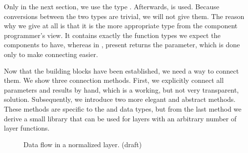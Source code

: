 \documentclass[preprint,natbib]{sigplanconf}
\begin{document}

\bc
Only in the next section, we use the type . Afterwards,  is used. Because conversions between the two types are trivial, we will not give them. The reason why we give  at all is that it is the more appropriate type from the component programmer's view. It contains exactly the function types we expect the components to have, whereas in , present returns the  parameter, which is done only to make connecting easier.
\ec

\bc
Now that the building blocks have been established, we need a way to connect them. We show three connection methods. First, we explicitly connect all parameters and results by hand, which is a working, but not very transparent, solution. Subsequently, we introduce two more elegant and abstract methods. These methods are specific to the  and  data types, but from the last method we derive a small library that can be used for layers with an arbitrary number of layer functions. 
\ec

\begin{figure}
\begin{small}
\begin{center}
\begin{center}
\begin{minipage}[b]{\textwidth}
\begin{scriptsize}
\end{scriptsize}
\end{minipage}
\end{center}\caption{Data flow in a normalized layer. (draft)}\label{wrapped} 
\end{center}
\end{small}
\end{figure}
\end{document}
